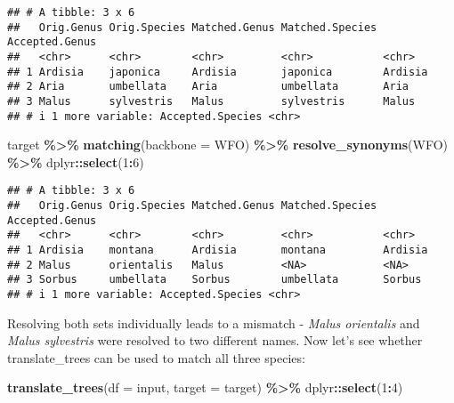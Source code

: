 \documentclass[
  11pt,
]{article}
\newenvironment{Shaded}{\begin{snugshade}}{\end{snugshade}}
\newcommand{\AttributeTok}[1]{\textcolor[rgb]{0.13,0.29,0.53}{#1}}
\newcommand{\DecValTok}[1]{\textcolor[rgb]{0.00,0.00,0.81}{#1}}
\newcommand{\FunctionTok}[1]{\textcolor[rgb]{0.13,0.29,0.53}{\textbf{#1}}}
\newcommand{\NormalTok}[1]{#1}
\newcommand{\SpecialCharTok}[1]{\textcolor[rgb]{0.81,0.36,0.00}{\textbf{#1}}}
\newcommand{\StringTok}[1]{\textcolor[rgb]{0.31,0.60,0.02}{#1}}
\begin{document}
\begin{verbatim}
## # A tibble: 3 x 6
##   Orig.Genus Orig.Species Matched.Genus Matched.Species Accepted.Genus
##   <chr>      <chr>        <chr>         <chr>           <chr>         
## 1 Ardisia    japonica     Ardisia       japonica        Ardisia       
## 2 Aria       umbellata    Aria          umbellata       Aria          
## 3 Malus      sylvestris   Malus         sylvestris      Malus         
## # i 1 more variable: Accepted.Species <chr>
\end{verbatim}

\begin{Shaded}
\begin{Highlighting}[]
\NormalTok{target }\SpecialCharTok{\%\textgreater{}\%}
  \FunctionTok{matching}\NormalTok{(}\AttributeTok{backbone =} \StringTok{\textquotesingle{}WFO\textquotesingle{}}\NormalTok{) }\SpecialCharTok{\%\textgreater{}\%}
  \FunctionTok{resolve\_synonyms}\NormalTok{(}\StringTok{\textquotesingle{}WFO\textquotesingle{}}\NormalTok{) }\SpecialCharTok{\%\textgreater{}\%}
\NormalTok{  dplyr}\SpecialCharTok{::}\FunctionTok{select}\NormalTok{(}\DecValTok{1}\SpecialCharTok{:}\DecValTok{6}\NormalTok{)}
\end{Highlighting}
\end{Shaded}

\begin{verbatim}
## # A tibble: 3 x 6
##   Orig.Genus Orig.Species Matched.Genus Matched.Species Accepted.Genus
##   <chr>      <chr>        <chr>         <chr>           <chr>         
## 1 Ardisia    montana      Ardisia       montana         Ardisia       
## 2 Malus      orientalis   Malus         <NA>            <NA>          
## 3 Sorbus     umbellata    Sorbus        umbellata       Sorbus        
## # i 1 more variable: Accepted.Species <chr>
\end{verbatim}

\normalsize

Resolving both sets individually leads to a mismatch - \emph{Malus
orientalis} and \emph{Malus sylvestris} were resolved to two different
names. Now let's see whether translate\_trees can be used to match all
three species: \small

\begin{Shaded}
\begin{Highlighting}[]
\FunctionTok{translate\_trees}\NormalTok{(}\AttributeTok{df =}\NormalTok{ input, }\AttributeTok{target =}\NormalTok{ target) }\SpecialCharTok{\%\textgreater{}\%} 
\NormalTok{  dplyr}\SpecialCharTok{::}\FunctionTok{select}\NormalTok{(}\DecValTok{1}\SpecialCharTok{:}\DecValTok{4}\NormalTok{) }
\end{Highlighting}
\end{Shaded}
\end{document}
